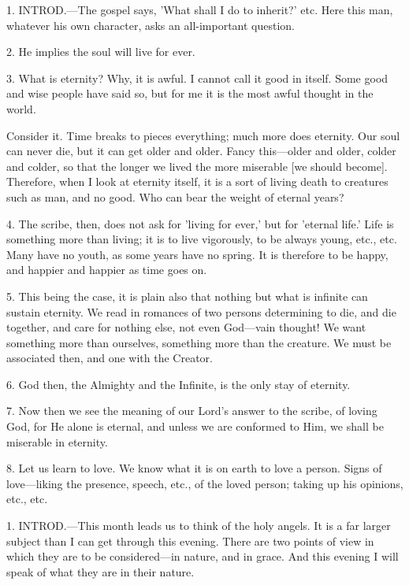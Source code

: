 1. INTROD.—The
gospel says, 'What shall I do to inherit?' etc. Here this man,
whatever his own character, asks an all-important question.

2. He implies the soul will live for ever.

3. What is eternity? Why, it is awful. I cannot
call it good in itself. Some good and wise people have said so, but
for me it is the most awful thought in the world.

Consider it. Time breaks to pieces everything;
much more does eternity. Our soul can never die, but it can get older
and older. Fancy this—older and older, colder and colder, so that
the longer we lived the more miserable [we should become]. Therefore,
when I look at eternity itself, it is a sort of living death to
creatures such as man, and no good. Who can bear the weight of eternal
years?

4. The scribe, then, does not ask for 'living for
ever,' but for 'eternal life.' Life is something more than living; it
is to live vigorously, to be always young, etc., etc. Many have no
youth, as some years have no spring. It is therefore to be happy, and
happier and happier as time goes on.

5. This being the case, it is plain also that
nothing but what is infinite can sustain eternity. We read in romances
of two persons determining to die, and die together, and care for
nothing else, not even God—vain thought! We want something more than
ourselves, something more than the creature. We must be associated
then, and one with the Creator.

6. God then, the Almighty and the Infinite, is
the only stay of eternity.

7. Now then we see the meaning of our Lord's
answer to the scribe, of loving God, for He alone is eternal, and
unless we are conformed to Him, we shall be miserable in eternity.

8. Let us learn to love. We know what it is on
earth to love a person. Signs of love—liking the presence, speech,
etc., of the loved person; taking up his opinions, etc., etc.


1. INTROD.—This
month leads us to think of the holy angels. It is a far larger subject
than I can get through this evening. There are two points of view in
which they are to be considered—in nature, and in grace. And this
evening I will speak of what they are in their nature.

